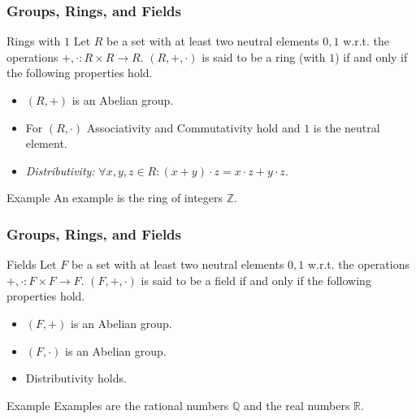 \documentclass{beamer}
\begin{document}
\begin{frame}
\frametitle{Groups, Rings, and Fields}
\begin{block}{Rings with $1$}
Let $R$ be a set with at least two neutral elements $0,1$ w.r.t. the operations $+,\cdot: R\times R\to R$. $(R,+,\cdot)$ is said to be a ring (with $1$) if and only if the following properties hold.
\pause
\begin{itemize}
  \item $(R,+)$ is an Abelian group.\pause
  \item For $(R,\cdot)$ Associativity and Commutativity hold and $1$ is the neutral element.\pause
  \item \textit{Distributivity:} $\forall x,y,z\in R: (x+y)\cdot z=x\cdot z + y\cdot z$.
\end{itemize}
\end{block}

\begin{block}{Example}
An example is the ring of integers $\mathbb{Z}$.
\end{block}

\end{frame}

\begin{frame}
\frametitle{Groups, Rings, and Fields}
\begin{block}{Fields}
Let $F$ be a set with at least two neutral elements $0,1$ w.r.t. the operations $+,\cdot: F\times F\to F$. $(F,+,\cdot)$ is said to be a field if and only if the following properties hold.
\begin{itemize}
  \item $(F,+)$ is an Abelian group.
  \item $(F,\cdot)$ is an Abelian group.
  \item Distributivity holds.
\end{itemize}
\end{block}

\begin{block}{Example}
Examples are the rational numbers $\mathbb{Q}$ and the real numbers $\mathbb{R}$.
\end{block}
\end{frame}
\end{document}
